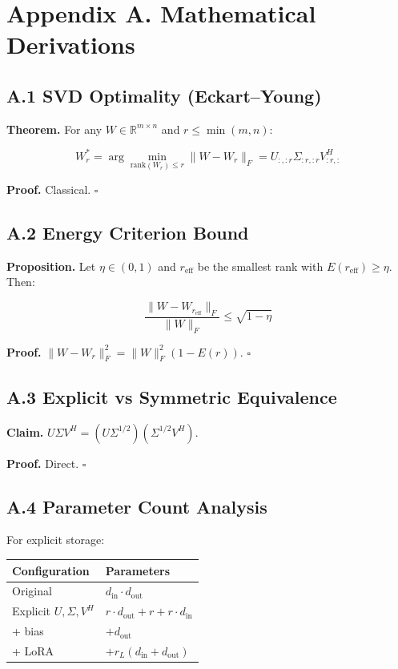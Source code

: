 
\section{Appendix A. Mathematical Derivations}

\subsection{A.1 SVD Optimality (Eckart--Young)}

\textbf{Theorem.} For any $W \in \mathbb{R}^{m \times n}$ and $r \leq \min(m, n)$:

\[
W_r^* = \arg\min_{\text{rank}(W_r) \leq r} \|W - W_r\|_F = U_{:, :r} \Sigma_{:r, :r} V_{:r, :}^H
\tag{A.1}
\]

\textbf{Proof.} Classical. $\square$

\subsection{A.2 Energy Criterion Bound}

\textbf{Proposition.} Let $\eta \in (0, 1)$ and $r_\text{eff}$ be the smallest 
rank with $E(r_\text{eff}) \geq \eta$. Then:

\[
\frac{\|W - W_{r_\text{eff}}\|_F}{\|W\|_F} \leq \sqrt{1 - \eta}
\tag{A.2}
\]

\textbf{Proof.} $\|W - W_r\|_F^2 = \|W\|_F^2 (1 - E(r))$. $\square$

\subsection{A.3 Explicit vs Symmetric Equivalence}

\textbf{Claim.} $U \Sigma V^H = (U \Sigma^{1/2}) (\Sigma^{1/2} V^H)$.

\textbf{Proof.} Direct. $\square$

\subsection{A.4 Parameter Count Analysis}

For explicit storage:

\begin{table}[H]
\centering
\small
\begin{tabular}{ll}
\toprule
\textbf{Configuration} & \textbf{Parameters} \\
\midrule
Original & $d_\text{in} \cdot d_\text{out}$ \\
Explicit $U, \Sigma, V^H$ & $r \cdot d_\text{out} + r + r \cdot d_\text{in}$ \\
+ bias & $+ d_\text{out}$ \\
+ LoRA & $+ r_L(d_\text{in} + d_\text{out})$ \\
\bottomrule
\end{tabular}
\end{table}

